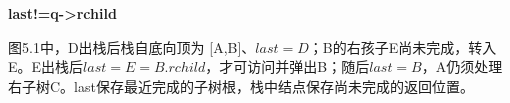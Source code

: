 {\color{ink}\bfseries last!=\allowbreak{}q->rchild}\par\vspace{1bp}图5.1中，D出栈后栈自底向顶为 [A,\allowbreak{}B]、\(last=\allowbreak{}D\)；B的右孩子E尚未完成，转入E。E出栈后\(last=\allowbreak{}E=\allowbreak{}B.rchild\)，才可访问并弹出B；随后\(last=\allowbreak{}B\)，A仍须处理右子树C。last保存最近完成的子树根，栈中结点保存尚未完成的返回位置。
